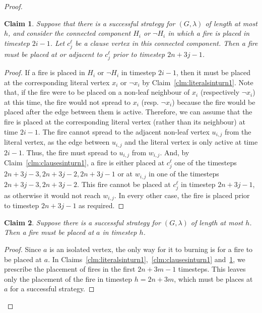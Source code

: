 \documentclass[preprint,12pt]{elsarticle}
\newtheorem{claim}{Claim}
\begin{document}
\begin{proof}
    \begin{claim}
        \label{clm:satclause1}
        Suppose that there is a successful strategy for $(G,\lambda)$ of length at most $h$, and consider the connected component $H_i$ or $\lnot H_i$ in which a fire is placed in timestep $2i-1$. Let $c_j^{\ell}$ be a clause vertex in this connected component. Then a fire must be placed at or adjacent to $c_j^{\ell}$ prior to timestep $2n+3j-1$.
    \end{claim}
    \begin{proof}
        If a fire is placed in $H_i$ or $\lnot H_i$ in timestep $2i-1$, then it must be placed at the corresponding literal vertex $x_i$ or $\lnot x_i$ by Claim~\ref{clm:literalsinturn1}. Note that, if the fire were to be placed on a non-leaf neighbour of $x_i$ (respectively $\lnot x_i$) at this time, the fire would not spread to $x_i$ (resp. $\lnot x_i$) because the fire would be placed after the edge between them is active. Therefore, we can assume that the fire is placed at the corresponding literal vertex (rather than its neighbour) at time $2i-1$.
        The fire cannot spread to the adjacent non-leaf vertex $u_{i,j}$ from the literal vertex, as the edge between $u_{i,j}$ and the literal vertex is only active at time $2i-1$. Thus, the fire must spread to $u_{i,j}$ from $w_{i,j}$. And, by Claim~\ref{clm:clausesinturn1}, a fire is either placed at $c_j^\ell$ one of the timesteps $2n+3j-3, 2n+3j-2, 2n+3j-1$ or at $w_{i,j}$ in one of the timesteps $2n+3j-3, 2n+3j-2$. This fire cannot be placed at $c_j^\ell$ in timestep $2n+3j-1$, as otherwise it would not reach $w_{i,j}$. In every other case, the fire is placed prior to timestep $2n+3j-1$ as required.
    \end{proof}

    \begin{claim}\label{clm:iso}
        Suppose there is a successful strategy for $(G,\lambda)$ of length at most $h$. Then a fire must be placed at $a$ in timestep $h$.
    \end{claim}
    \begin{proof}
        Since $a$ is an isolated vertex, the only way for it to burning is for a fire to be placed at $a$. In Claims~\ref{clm:literalsinturn1},~\ref{clm:clausesinturn1} and~\ref{clm:satclause1}, we prescribe the placement of fires in the first $2n+3m-1$ timesteps. This leaves only the placement of the fire in timestep $h=2n+3m$, which must be places at $a$ for a successful strategy.
    \end{proof}
    

\end{proof}
\end{document}
